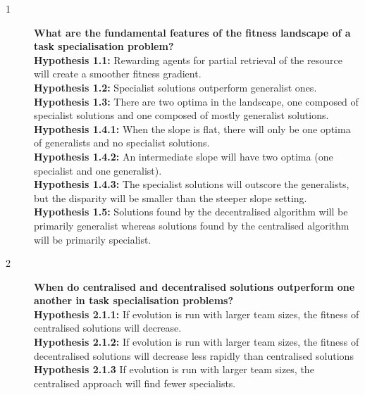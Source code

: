 \documentclass[12pt]{article}
\begin{document}
\begin{description}
\item[1] \textbf{What are the fundamental features of the fitness landscape of a task specialisation problem?}\\

\textbf{Hypothesis 1.1:} Rewarding agents for partial retrieval of the resource will create a smoother fitness gradient.\\

\textbf{Hypothesis 1.2:} Specialist solutions outperform generalist ones.\\

\textbf{Hypothesis 1.3:} There are two optima in the landscape, one composed of specialist solutions and one composed of mostly generalist solutions. \\

\textbf{Hypothesis 1.4.1:} When the slope is flat, there will only be one optima of generalists and no specialist solutions.\\

\textbf{Hypothesis 1.4.2:} An intermediate slope will have two optima (one specialist and one generalist).\\

\textbf{Hypothesis 1.4.3:} The specialist solutions will outscore the generalists, but the disparity will be smaller than the steeper slope setting. \\

\textbf{Hypothesis 1.5:} Solutions found by the decentralised algorithm will be primarily generalist whereas solutions found by the centralised algorithm will be primarily specialist.\\

\item[2] \textbf{When do centralised and decentralised solutions outperform one another in task specialisation problems?}\\

\textbf{Hypothesis 2.1.1:} If evolution is run with larger team sizes, the fitness of centralised solutions will decrease.\\

\textbf{Hypothesis 2.1.2:} If evolution is run with larger team sizes, the fitness of decentralised solutions will decrease less rapidly than centralised solutions\\

\textbf{Hypothesis 2.1.3} If evolution is run with larger team sizes, the centralised approach will find fewer specialists.\\


\end{description}
\end{document}

